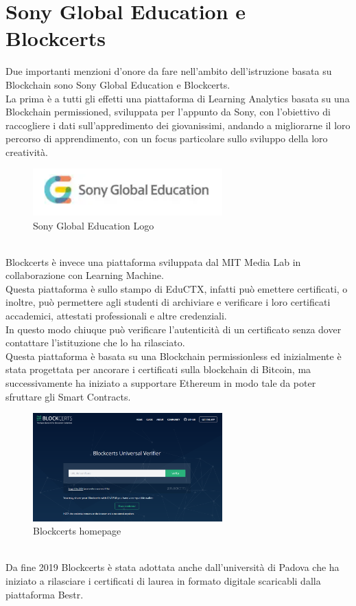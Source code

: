 \section{Sony Global Education e Blockcerts}
Due importanti menzioni d'onore da fare nell'ambito dell'istruzione basata su Blockchain sono Sony Global Education e Blockcerts.
\\La prima è a tutti gli effetti una piattaforma di Learning Analytics basata su una Blockchain permissioned, sviluppata per l'appunto da Sony, con l'obiettivo di raccogliere i dati 
sull'appredimento dei giovanissimi, andando a migliorarne il loro percorso di apprendimento, con un focus particolare sullo sviluppo della loro creatività.
\begin{figure}[h]
    \centering
    \includegraphics[width=0.65\textwidth]{Immagini/Sony_Global_Education_logo.PNG}
    \caption{Sony Global Education Logo}
\end{figure}
\\Blockcerts è invece una piattaforma sviluppata dal MIT Media Lab in collaborazione con Learning Machine. 
\\Questa piattaforma è sullo stampo di EduCTX,
infatti può emettere certificati, o inoltre, può permettere agli studenti di archiviare e verificare i loro certificati accademici, attestati professionali e altre credenziali.
\\In questo modo chiuque può verificare l'autenticità di un certificato senza dover contattare l'istituzione che lo ha rilasciato.
\\Questa piattaforma è basata su una Blockchain permissionless ed inizialmente è stata progettata per ancorare i certificati sulla blockchain di Bitcoin, 
ma successivamente ha iniziato a supportare Ethereum in modo tale da poter sfruttare gli Smart Contracts.
\begin{figure}[h]
    \centering
    \includegraphics[width=0.65\textwidth]{Immagini/Blockcerts_homepage.PNG}
    \caption{Blockcerts homepage}
\end{figure}
\\Da fine 2019 Blockcerts è stata adottata anche dall'università di Padova che ha iniziato a rilasciare i certificati di laurea in formato digitale scaricabli dalla piattaforma Bestr.
